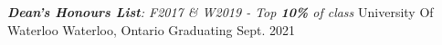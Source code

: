 \begin{siderulesEdu}
\begin{cventries}
  \cventry
    {\emph{\color{black}{Candidate of B.ASc: Honours Mechanical Engineering,}  \break\textbf{Dean's Honours List}: F2017 \& W2019 - \textit{Top \textbf{10\%} of class}}}
    {University Of Waterloo}
    {Waterloo, Ontario}
    {Graduating Sept. 2021}
    {}
\end{cventries}
\end{siderulesEdu}

